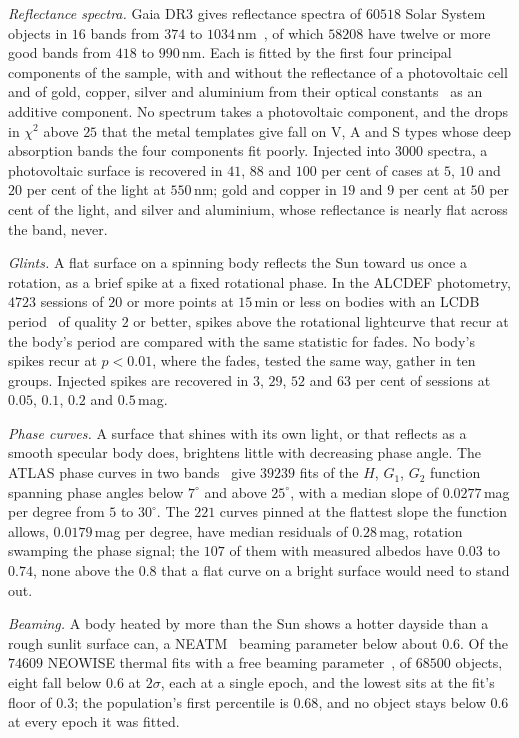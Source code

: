\documentclass[3p,11pt]{elsarticle}
\begin{document}
\emph{Reflectance spectra.} Gaia DR3 gives reflectance spectra of $60518$ Solar System
objects in $16$ bands from $374$ to $1034$\,nm~\cite{Galluccio2023}, of which $58208$
have twelve or more good bands from $418$ to $990$\,nm. Each is fitted by the first
four principal components of the sample, with and without the reflectance of a
photovoltaic cell and of gold, copper, silver and aluminium from their optical
constants~\cite{Polyanskiy2024} as an additive component. No spectrum takes a
photovoltaic component, and the drops in $\chi^2$ above $25$ that the metal templates
give fall on V, A and S types whose deep absorption bands the four components fit
poorly. Injected into $3000$ spectra, a photovoltaic surface is recovered in $41$, $88$
and $100$ per cent of cases at $5$, $10$ and $20$ per cent of the light at $550$\,nm;
gold and copper in $19$ and $9$ per cent at $50$ per cent of the light, and silver and
aluminium, whose reflectance is nearly flat across the band, never.

\emph{Glints.} A flat surface on a spinning body reflects the Sun toward us once a
rotation, as a brief spike at a fixed rotational phase. In the ALCDEF photometry,
$4723$ sessions of $20$ or more points at $15$\,min or less on bodies with an LCDB
period~\cite{Warner2009} of quality $2$ or better, spikes above the rotational
lightcurve that recur at the body's period are compared with the same statistic for
fades. No body's spikes recur at $p<0.01$, where the fades, tested the same way, gather
in ten groups. Injected spikes are recovered in $3$, $29$, $52$ and $63$ per cent of
sessions at $0.05$, $0.1$, $0.2$ and $0.5$\,mag.

\emph{Phase curves.} A surface that shines with its own light, or that reflects as a
smooth specular body does, brightens little with decreasing phase angle. The ATLAS
phase curves in two bands~\cite{Mahlke2021} give $39239$ fits of the $H$, $G_1$, $G_2$
function~\cite{Muinonen2010} spanning phase angles below $7^\circ$ and above $25^\circ$,
with a median slope of $0.0277$\,mag per degree from $5$ to $30^\circ$. The $221$ curves
pinned at the flattest slope the function allows, $0.0179$\,mag per degree, have median
residuals of $0.28$\,mag, rotation swamping the phase signal; the $107$ of them with
measured albedos have $0.03$ to $0.74$, none above the $0.8$ that a flat curve on a bright
surface would need to stand out.

\emph{Beaming.} A body heated by more than the Sun shows a hotter dayside than a rough
sunlit surface can, a NEATM~\cite{Harris1998} beaming parameter below about $0.6$. Of
the $74609$ NEOWISE thermal fits with a free beaming parameter~\cite{Mainzer2011}, of
$68500$ objects, eight fall below $0.6$ at $2\sigma$, each at a single epoch, and the
lowest sits at the fit's floor of $0.3$; the population's first percentile is $0.68$,
and no object stays below $0.6$ at every epoch it was fitted.
\end{document}
